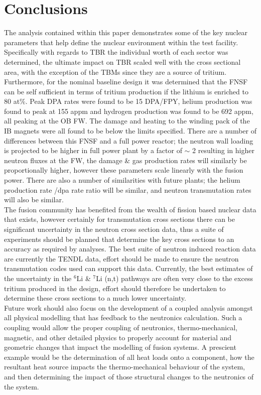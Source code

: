 \documentclass[12pt, letterpaper]{elsarticle}
\begin{document}
\section{Conclusions} \label{conclusion}
The analysis contained within this paper demonstrates some of the key nuclear parameters that help define the nuclear environment within the test facility. Specifically with regards to TBR the individual worth of each sector was determined, the ultimate impact on TBR scaled well with the cross sectional area, with 
the exception of the TBMs since they are a source of tritium. Furthermore, for the nominal baseline design it was determined that the FNSF can be self sufficient in terms of tritium production if the lithium is enriched to 80 at\%. Peak DPA rates were found to be 15 DPA/FPY, helium production was found to peak at 155 appm  and hydrogen production was found to be 692 appm, all peaking at the OB FW. The damage and heating to the winding pack of the IB magnets were all found to be below the limits specified. There are a number of differences between this FNSF and a full power reactor; the neutron wall loading is projected to be higher in full power plant by a factor of $\sim$ 2 resulting in higher neutron fluxes at the FW, the damage \& gas production rates will similarly be proportionally higher, however these parameters scale linearly with the fusion power. There are also a number of similarities with future plants; the helium production rate /dpa rate ratio will be similar, and neutron transmutation rates will also be similar.
\\

The fusion community has benefited from the wealth of fission based nuclear data that exists, however certainly for transmutation cross sections there can be significant uncertainty in the neutron cross section data, thus a suite of experiments should be planned that determine the key cross sections to an accuracy as required by analyses. The best suite of neutron induced reaction data are currently the TENDL \cite{ref_15} data, effort should be made to ensure the neutron transmutation codes used can support this data. Currently, the best estimates of the uncertainty \cite{ref_16} in the $^6$Li \& $^7$Li (n,t) pathways are often very close to the excess tritium produced in the design, effort should therefore be undertaken to determine these cross sections to a much lower uncertainty.
\\

Future work should also focus on the development of a coupled analysis amongst all physical modelling that has feedback to the neutronics calculation. Such a coupling would allow the proper coupling of neutronics, thermo-mechanical, magnetic, and other detailed physics to properly account for material and geometric changes that impact the modelling of fusion systems. A prescient example would be the determination of all heat loads onto a component, how the resultant heat source impacts the thermo-mechanical behaviour of the system, and then determining the impact of those structural changes to the neutronics of the system.
\end{document}

